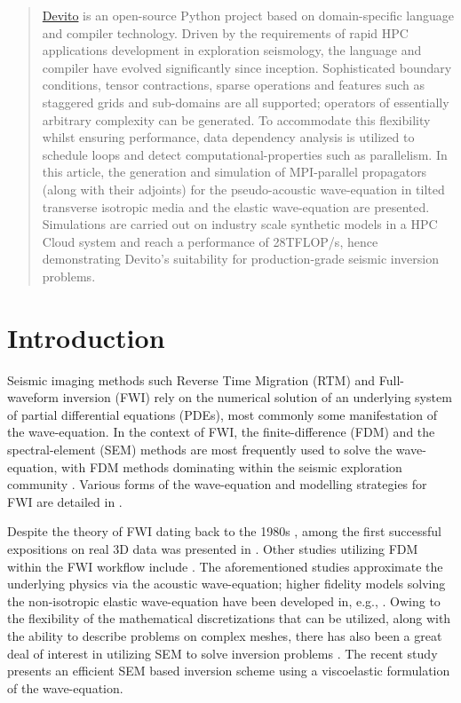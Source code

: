 \documentclass[conference]{IEEEtran}
\begin{document}
\begin{abstract}\label{abstract}

 \href{https://github.com/devitocodes/devito}{Devito}  is an open-source
Python project based on domain-specific language and compiler
technology. Driven by the requirements of rapid HPC applications
development in exploration seismology, the language and compiler have
evolved significantly since inception. Sophisticated boundary
conditions, tensor contractions, sparse operations and features such as
staggered grids and sub-domains are all supported; operators of
essentially arbitrary complexity can be generated. To accommodate this
flexibility whilst ensuring performance, data dependency analysis is
utilized to schedule loops and detect computational-properties such as
parallelism. In this article, the generation and simulation of
MPI-parallel propagators (along with their adjoints) for the
pseudo-acoustic wave-equation in tilted transverse isotropic media and
the elastic wave-equation are presented. Simulations are carried out on
industry scale synthetic models in a HPC Cloud system and reach a
performance of 28TFLOP/s, hence demonstrating Devito's suitability for
production-grade seismic inversion problems.
\end{abstract}

\section{Introduction}\label{introduction}

Seismic imaging methods such Reverse Time Migration (RTM) and
Full-waveform inversion (FWI) rely on the numerical solution of an
underlying system of partial differential equations (PDEs), most
commonly some manifestation of the wave-equation. In the context of FWI,
the finite-difference (FDM) and the spectral-element (SEM) methods are
most frequently used to solve the wave-equation, with FDM methods
dominating within the seismic exploration community \cite{lyu2020}.
Various forms of the wave-equation and modelling strategies for FWI are
detailed in \cite{fichtner2011}.

Despite the theory of FWI dating back to the 1980s
\cite{tarantola}, among the first successful
expositions on real 3D data was presented in \cite{sirgue}. Other
studies utilizing FDM within the FWI workflow include
\cite{ratcliffe2011, petersson2013}. The aforementioned studies
approximate the underlying physics via the acoustic wave-equation;
higher fidelity models solving the non-isotropic elastic wave-equation
have been developed in, e.g.,
\cite{osti_1468379, osti_1561580, osti_1561581, sava1, sava2}. Owing to
the flexibility of the mathematical discretizations that can be
utilized, along with the ability to describe problems on complex meshes,
there has also been a great deal of interest in utilizing SEM to solve
inversion problems \cite{peter2011, krebsdg}. The recent study
\cite{trinh2019} presents an efficient SEM based inversion scheme using
a viscoelastic formulation of the wave-equation.
\end{document}
